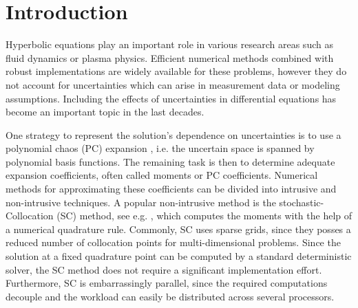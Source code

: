 \section{Introduction}
Hyperbolic equations play an important role in various research areas such as fluid dynamics or plasma physics. Efficient numerical methods combined with robust implementations are widely available for these problems, however they do not account for uncertainties which can arise in measurement data or modeling assumptions. Including the effects of uncertainties in differential equations has become an important topic in the last decades. %

One strategy to represent the solution's dependence on uncertainties is to use a polynomial chaos (PC) expansion \cite{wiener1938homogeneous,xiu2002wiener}, i.e. the uncertain space is spanned by polynomial basis functions. The remaining task is then to determine adequate expansion coefficients, often called moments or PC coefficients. Numerical methods for approximating these coefficients can be divided into intrusive and non-intrusive techniques. A popular non-intrusive method is the stochastic-Collocation (SC) method, see e.g. \cite{xiu2005high,babuvska2007stochastic,loeven2008probabilistic}, which computes the moments with the help of a numerical quadrature rule. Commonly, SC uses sparse grids, since they posses a reduced number of collocation points for multi-dimensional problems. Since the solution at a fixed quadrature point can be computed by a standard deterministic solver, the SC method does not require a significant implementation effort. Furthermore, SC is embarrassingly parallel, since the required computations decouple and the workload can easily be distributed across several processors. 

